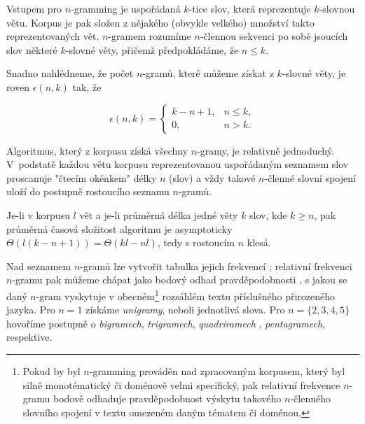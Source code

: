Vstupem pro $n$-gramming je uspořádaná $k$-tice slov, která reprezentuje
$k$-slovnou větu. Korpus je pak složen z nějakého (obvykle velkého) množství
takto reprezentovaných vět. $n$-gramem rozumíme $n$-člennou sekvenci po sobě
jsoucích slov některé $k$-slovné věty, přičemž předpokládáme, že $n \leq k$.

Snadno nahlédneme, že počet $n$-gramů, které můžeme získat z $k$-slovné věty,
je roven $\epsilon(n, k)$ tak, že

\begin{equation*}
  \epsilon(n, k) = \left\{
  \begin{array}{rr}
  k - n + 1,  & n \leq k, \\
          0,  & n > k.
  \end{array} \right.
\end{equation*}

Algoritmus, který z korpusu získá všechny $n$-gramy,
je relativně jednoduchý.
V~podstatě každou větu korpusu reprezentovanou uspořádaným seznamem slov
proscanuje "čtecím okénkem" délky $n$ (slov) a vždy takové $n$-členné slovní
spojení uloží do postupně rostoucího seznamu $n$-gramů.

Je-li v korpusu $l$ vět a je-li průměrná délka jedné věty $k$ slov, kde
$k \geq n$, pak průměrná časová složitost algoritmu je asymptoticky
$\Theta(l(k - n + 1)) = \Theta(kl-nl)$, tedy s rostoucím $n$ klesá.

Nad seznamem $n$-gramů lze vytvořit tabulka jejich frekvencí%
; relativní
frekvenci $n$-gramu pak můžeme chápat jako bodový odhad pravděpodobnosti%
,
s jakou se daný $n$-gram vyskytuje v obecném\footnote{Pokud by byl $n$-gramming%
prováděn nad zpracovaným korpusem, který byl silně monotématický či doménově
velmi specifický, pak relativní frekvence $n$-gramu bodově odhaduje
pravděpodobnost výskytu takového $n$-členného slovního spojení v textu
omezeném daným tématem či doménou.} rozsáhlém textu příslušného
přirozeného jazyka. Pro $n = 1$ získáme \textit{unigramy}, neboli jednotlivá
slova. Pro $n = \{2, 3, 4, 5\}$ hovoříme postupně o \textit{bigramech},
\textit{trigramech}, \textit{quadriramech}%
, \textit{pentagramech}, respektive.

